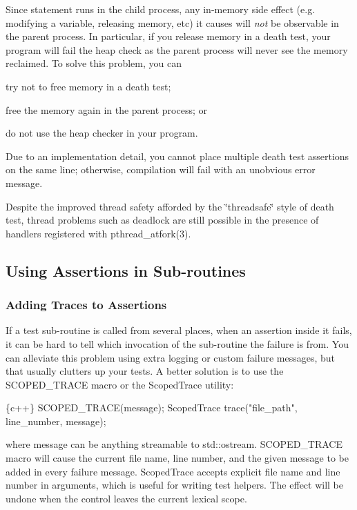 Since {\ttfamily statement} runs in the child process, any in-\/memory side effect (e.\+g. modifying a variable, releasing memory, etc) it causes will {\itshape not} be observable in the parent process. In particular, if you release memory in a death test, your program will fail the heap check as the parent process will never see the memory reclaimed. To solve this problem, you can


\begin{DoxyEnumerate}
\item try not to free memory in a death test;
\item free the memory again in the parent process; or
\item do not use the heap checker in your program.
\end{DoxyEnumerate}

Due to an implementation detail, you cannot place multiple death test assertions on the same line; otherwise, compilation will fail with an unobvious error message.

Despite the improved thread safety afforded by the \char`\"{}threadsafe\char`\"{} style of death test, thread problems such as deadlock are still possible in the presence of handlers registered with {\ttfamily pthread\+\_\+atfork(3)}.

\subsection*{Using Assertions in Sub-\/routines}

\subsubsection*{Adding Traces to Assertions}

If a test sub-\/routine is called from several places, when an assertion inside it fails, it can be hard to tell which invocation of the sub-\/routine the failure is from. You can alleviate this problem using extra logging or custom failure messages, but that usually clutters up your tests. A better solution is to use the {\ttfamily S\+C\+O\+P\+E\+D\+\_\+\+T\+R\+A\+CE} macro or the {\ttfamily Scoped\+Trace} utility\+:


\begin{DoxyCode}
\{c++\}
SCOPED\_TRACE(message);
ScopedTrace trace("file\_path", line\_number, message);
\end{DoxyCode}


where {\ttfamily message} can be anything streamable to {\ttfamily std\+::ostream}. {\ttfamily S\+C\+O\+P\+E\+D\+\_\+\+T\+R\+A\+CE} macro will cause the current file name, line number, and the given message to be added in every failure message. {\ttfamily Scoped\+Trace} accepts explicit file name and line number in arguments, which is useful for writing test helpers. The effect will be undone when the control leaves the current lexical scope.

